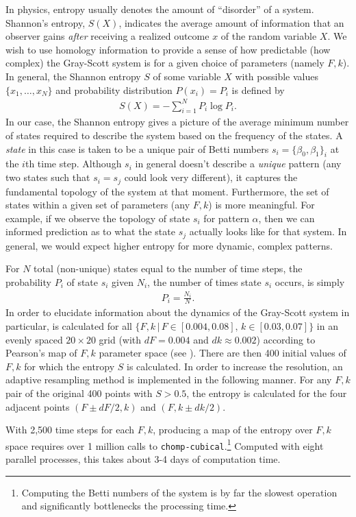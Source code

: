 In physics, entropy usually denotes the amount of ``disorder'' of a system. Shannon's entropy, $S(X)$, indicates the average amount of information that an observer gains \emph{after} receiving a realized outcome $x$ of the random variable $X$. We wish to use homology information to provide a sense of how predictable (how complex) the Gray-Scott system is for a given choice of parameters (namely $F, k$). In general, the Shannon entropy $S$ of some variable $X$ with possible values $\{ x_1, \ldots, x_N \}$ and probability distribution $P(x_i) = P_i$ is defined by
\begin{align} \label{eq:shannon}
	S(X) = - \sum_{i=1}^{N} P_i \log{ P_i}.
\end{align}
In our case, the Shannon entropy gives a picture of the average minimum number of states required to describe the system based on the frequency of the states. A \emph{state} in this case is taken to be a unique pair of Betti numbers $s_i = \{ \beta_0, \beta_1 \}_i$ at the $i$th time step. Although $s_i$ in general doesn't describe a \emph{unique} pattern (any two states such that $s_i = s_j$ could look very different), it captures the fundamental topology of the system at that moment. Furthermore, the set of states within a given set of parameters (any $F, k$) is more meaningful. For example, if we observe the topology of state $s_i$ for pattern $\alpha$, then we can informed prediction as to what the state $s_j$ actually looks like for that system. In general, we would expect higher entropy for more dynamic, complex patterns.

For $N$ total (non-unique) states equal to the number of time steps, the probability $P_i$ of state $s_i$ given $N_i$, the number of times state $s_i$ occurs, is simply
\begin{align} \label{eq:Pi}
	P_i = \frac{N_i}{N}.
\end{align}
In order to elucidate information about the dynamics of the Gray-Scott system in particular,  is calculated for all $\{ F, k \, | \, F \in [0.004, 0.08], \, k \in [0.03, 0.07] \}$ in an evenly spaced $20 \times 20$ grid (with $dF = 0.004$ and $dk \approx 0.002$) according to Pearson's map of $F, k$ parameter space (see ). There are then 400 initial values of $F,k$ for which the entropy $S$ is calculated. In order to increase the resolution, an adaptive resampling method is implemented in the following manner. For any $F, k$ pair of the original 400 points with $S > 0.5$, the entropy is calculated for the four adjacent points $(F \pm dF/2, k)$ and $(F, k \pm dk/2)$. 

With 2,500 time steps for each $F,k$, producing a map of the entropy over $F,k$ space requires over 1 million calls to \texttt{chomp-cubical}.\footnote{Computing the Betti numbers of the system is by far the slowest operation and significantly bottlenecks the processing time.} Computed with eight parallel processes, this takes about 3-4 days of computation time.

